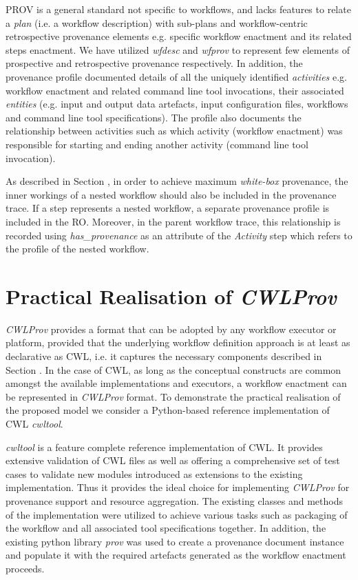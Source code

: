 \documentclass[a4paper,num-refs]{oup-contemporary}
\begin{document}
PROV is a general standard not specific to workflows, and lacks features to relate a \emph{plan} (i.e. a workflow description) with sub-plans and workflow-centric retrospective provenance elements e.g. specific workflow enactment and its related steps enactment. We have utilized \textit{wfdesc} and \textit{wfprov} to represent few elements of prospective and retrospective provenance respectively. In addition, the provenance profile documented details of all the uniquely identified \textit{activities} e.g. workflow enactment and related command line tool invocations, their associated \textit{entities} (e.g. input and output data artefacts, input configuration files, workflows and command line tool specifications). The profile also documents the relationship between activities such as which activity (workflow enactment) was responsible for starting and ending another activity (command line tool invocation). 

As described in Section \textbf{}, in order to achieve maximum \textit{white-box} provenance, the inner workings of a nested workflow should also be included in the provenance trace. If a step represents a nested workflow, a separate provenance profile is included in the RO. Moreover, in the parent workflow trace, this relationship is recorded using \textit{has\_provenance} as an attribute of the \textit{Activity} step which refers to the profile of the nested workflow.

\section{Practical Realisation of \textit{CWLProv}} \label{sec:demo}
\textit{CWLProv} \citep{cwlprov} provides a format that can be adopted by any workflow executor or platform, provided that the underlying workflow definition approach is at least as declarative as CWL, i.e. it captures the necessary components described in Section \textbf{}. In the case of CWL, as long as the conceptual constructs are common amongst the available implementations and executors, a workflow enactment can be represented in \textit{CWLProv} format. To demonstrate the practical realisation of the proposed model we consider a Python-based reference implementation of CWL \textit{cwltool}. 

\textit{cwltool} is a feature complete reference implementation of CWL. It provides extensive validation of CWL files as well as offering a comprehensive set of test cases to validate new modules introduced as extensions to the existing implementation. Thus it provides the ideal choice for implementing \textit{CWLProv} for provenance support and resource aggregation. The existing classes and methods of the implementation were utilized to achieve various tasks such as packaging of the workflow and all associated tool specifications together. In addition, the existing python library \textit{prov} \citep{provpython} was used to create a provenance document instance and populate it with the required artefacts generated as the workflow enactment proceeds.
\end{document}
